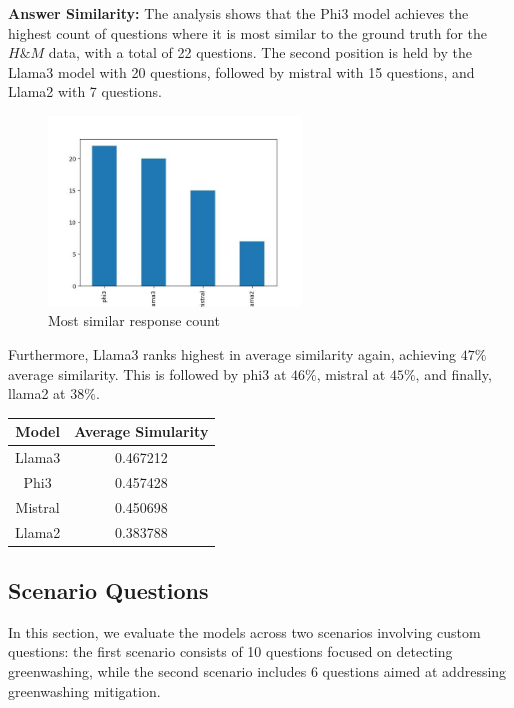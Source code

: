 \documentclass[]{article}
\begin{document}
\textbf{Answer Similarity:} 
The analysis shows that the Phi3 model achieves the highest count of questions where 
it is most similar to the ground truth for the $H\&M$ data, with a total of 22 questions. The second position is held by the Llama3 
model with 20 questions, followed by mistral with 15 questions, and Llama2 with 7 questions.

\begin{figure}[H]
    \centering
    \includegraphics[width=0.6\textwidth]{./images/highest_count_hm.jpg}
    \caption{Most similar response count}
    \label{fig:image_label}
\end{figure}

Furthermore, 
Llama3  ranks highest in average similarity again, 
achieving $47\%$ average similarity. This is followed by phi3 at $46\%$, mistral at $45\%$, and finally, 
llama2 at $38\%$.

\begin{center}
    \begin{tabular}{||c c||} 
     \hline
     \textbf{Model} & \textbf{Average Simularity}  \\ [0.5ex] 
     \hline
     Llama3 & 0.467212 \\ 
     \hline
     Phi3 & 0.457428  \\
     \hline
     Mistral & 0.450698 \\
     \hline
     Llama2 & 0.383788  \\
     \hline
    \end{tabular}
\end{center}

\subsection{Scenario Questions}
In this section, we evaluate the models across two scenarios involving custom questions: 
the first scenario consists of 10 questions focused on detecting greenwashing, 
while the second scenario includes 6 questions aimed at addressing greenwashing mitigation.
\end{document}
